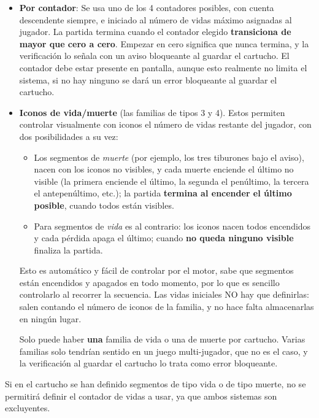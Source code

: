 \begin{itemize}
	\item \textbf{Por contador}: Se usa uno de los 4 contadores posibles, con cuenta descendente siempre, e iniciado al número de vidas máximo asignadas al jugador. La partida termina cuando el contador elegido \textbf{transiciona de mayor que cero a cero}. Empezar en cero significa que nunca termina, y la verificación lo señala con un aviso bloqueante al guardar el cartucho. El contador debe estar presente en pantalla, aunque esto realmente no limita el sistema, si no hay ninguno se dará un error bloqueante al guardar el cartucho. 
	
	\item \textbf{Iconos de vida/muerte} (las familias de tipos 3 y 4). Estos permiten controlar visualmente con iconos el número de vidas restante del jugador, con dos posibilidades a su vez:
	\begin{itemize}
		\item 	Los segmentos de \emph{muerte} (por ejemplo, los tres tiburones bajo el aviso), nacen con los iconos no visibles, y cada muerte enciende el último no visible (la primera enciende el último, la segunda el penúltimo, la tercera el antepenúltimo, etc.); la partida \textbf{termina al encender el último posible}, cuando todos están visibles. 
		
		\item 	Para segmentos de \emph{vida} es al contrario: los iconos nacen todos encendidos y cada pérdida apaga el último; cuando \textbf{no queda ninguno visible} finaliza la partida.
	\end{itemize}
	Esto es automático y fácil de controlar por el motor, sabe que segmentos están encendidos y apagados en todo momento, por lo que es sencillo controlarlo al recorrer la secuencia. Las vidas iniciales NO hay que definirlas: salen contando el número de iconos de la familia, y no hace falta almacenarlas en ningún lugar.
	
	Solo puede haber \textbf{una} familia de vida o una de muerte por cartucho.
	Varias familias solo tendrían sentido en un juego multi-jugador, que no es el
	caso, y la verificación al guardar el cartucho lo trata como error bloqueante.
	
\end{itemize}

Si en el cartucho se han definido segmentos de tipo vida o de tipo muerte, no se permitirá definir el contador de vidas a usar, ya que ambos sistemas son excluyentes.

